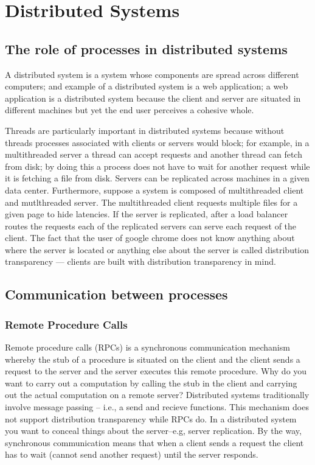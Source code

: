 \documentclass[10pt]{article}
\begin{document}
\section{Distributed Systems}
\subsection{The role of processes in distributed systems}
A distributed system is a system whose components are spread across different computers; and example of a distributed system is a web application; a web application is a distributed system because the client and server are situated in different machines but yet the end user perceives a cohesive whole.

Threads are particularly important in distributed systems because without threads processes associated with clients or servers would block; for example, in a multithreaded server a thread can accept requests and another thread can fetch from disk; by doing this a process does not have to wait for another request while it is fetching a file from disk. Servers can be replicated across machines in a given data center. Furthermore, suppose a system is composed of multithreaded client and mutlthreaded server. The multithreaded client requests multiple files for a given page to hide latencies. If the server is replicated, after a load balancer routes the requests each of the replicated servers can serve each request of the client. The fact that the user of google chrome does not know anything about where the server is located or anything else about the server is called distribution transparency --- clients are built with distribution transparency in mind.

\subsection{Communication between processes}
\subsubsection{Remote Procedure Calls}
Remote procedure calls (RPCs) is a synchronous communication mechanism whereby the stub of a procedure is situated on the client and the client sends a request to the server and the server executes this remote procedure. Why do you want to carry out a computation by calling the stub in the client and carrying out the actual computation on a remote server? Distributed systems traditionally involve message passing -- i.e., a send and recieve functions. This mechanism does not support distribution transparency while RPCs do. In a distributed system you want to conceal things about the server--e.g, server replication. By the way, synchronous communication means that when a client sends a request the client has to wait (cannot send another request) until the server responds.
\end{document}
